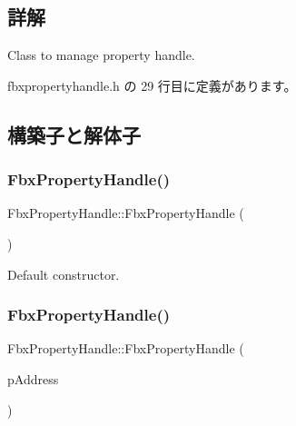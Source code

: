 \subsection{詳解}
Class to manage property handle. 

 fbxpropertyhandle.\+h の 29 行目に定義があります。



\subsection{構築子と解体子}
\mbox{\label{class_fbx_property_handle_a6353ed814add637287bf3a86a4d097be}} 
\subsubsection{\texorpdfstring{Fbx\+Property\+Handle()}{FbxPropertyHandle()}\hspace{0.1cm}{\footnotesize\ttfamily [1/3]}}
{\footnotesize\ttfamily Fbx\+Property\+Handle\+::\+Fbx\+Property\+Handle (\begin{DoxyParamCaption}{ }\end{DoxyParamCaption})}



Default constructor. 

\mbox{\label{class_fbx_property_handle_ad95e794ff4c44aed3b73c6dabd4475da}} 
\subsubsection{\texorpdfstring{Fbx\+Property\+Handle()}{FbxPropertyHandle()}\hspace{0.1cm}{\footnotesize\ttfamily [2/3]}}
{\footnotesize\ttfamily Fbx\+Property\+Handle\+::\+Fbx\+Property\+Handle (\begin{DoxyParamCaption}\item[{const \hyperlink{class_fbx_property_handle}{Fbx\+Property\+Handle} \&}]{p\+Address }\end{DoxyParamCaption})}

